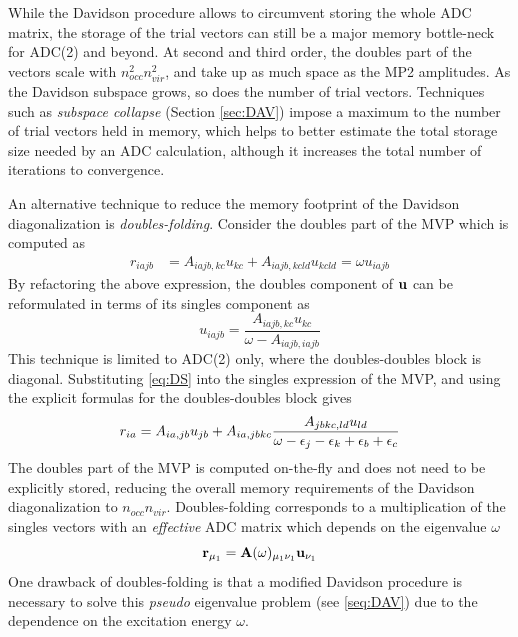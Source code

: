 While the Davidson procedure allows to circumvent storing the whole ADC matrix, the storage of the trial vectors can still be a major memory bottle-neck for ADC(2) and beyond. At second and third order, the doubles part of the vectors scale with $n_{occ}^2n_{vir}^2$, and take up as much space as the MP2 amplitudes. As the Davidson subspace grows, so does the number of trial vectors. Techniques such as \emph{subspace collapse} (Section \ref{sec:DAV}) impose a maximum to the number of trial vectors held in memory, which helps to better estimate the total storage size needed by an ADC calculation, although it increases the total number of iterations to convergence.

An alternative technique to reduce the memory footprint of the Davidson diagonalization is \emph{doubles-folding}. Consider the doubles part of the MVP which is computed as
\begin{align}
r_{iajb} &= A_{iajb,kc} u_{kc} + A_{iajb,kcld} u_{kcld} = \omega u_{iajb}
\end{align}
\noindent By refactoring the above expression, the doubles component of $\mathbf{u}$ can be reformulated in terms of its singles component as
\begin{equation}
u_{iajb} = \frac{A_{iajb,kc} u_{kc}}{\omega - A_{iajb,iajb}} 
\label{eq:DS}
\end{equation}
\noindent This technique is limited to ADC(2) only, where the doubles-doubles block is diagonal. Substituting \ref{eq:DS} into the singles expression of the MVP, and using the explicit formulas for the doubles-doubles block gives
\begin{equation}
r_{ia} = A_{ia,jb} u_{jb} + A_{ia,jbkc} \frac{A_{jbkc,ld} u_{ld}}{\omega - \epsilon_j - \epsilon_k + \epsilon_b + \epsilon_c} 
\end{equation}
\noindent The doubles part of the MVP is computed on-the-fly and does not need to be explicitly stored, reducing the overall memory requirements of the Davidson diagonalization to $n_{occ}n_{vir}$. Doubles-folding corresponds to a multiplication of the singles vectors with an \emph{effective} ADC matrix which depends on the eigenvalue $\omega$
\begin{equation}
\mathbf{r}_{\mu_1} = \mathbf{A}(\omega)_{\mu_1\nu_1} \mathbf{u}_{\nu_1} 
\end{equation}
\noindent One drawback of doubles-folding is that a modified Davidson procedure is necessary to solve this \emph{pseudo} eigenvalue problem (see \ref{seq:DAV}) due to the dependence on the excitation energy $\omega$.

